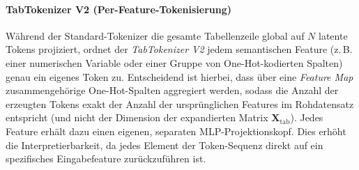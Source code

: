\paragraph{TabTokenizer V2 (Per-Feature-Tokenisierung)} Während der Standard-Tokenizer die gesamte Tabellenzeile global auf $N$ latente Tokens projiziert, ordnet der \textit{TabTokenizer V2} jedem semantischen Feature (z.\,B. einer numerischen Variable oder einer Gruppe von One-Hot-kodierten Spalten) genau ein eigenes Token zu. Entscheidend ist hierbei, dass über eine \textit{Feature Map} zusammengehörige One-Hot-Spalten aggregiert werden, sodass die Anzahl der erzeugten Tokens exakt der Anzahl der ursprünglichen Features im Rohdatensatz entspricht (und nicht der Dimension der expandierten Matrix $\mathbf{X}_{\text{tab}}$). Jedes Feature erhält dazu einen eigenen, separaten MLP-Projektionskopf. Dies erhöht die Interpretierbarkeit, da jedes Element der Token-Sequenz direkt auf ein spezifisches Eingabefeature zurückzuführen ist.
